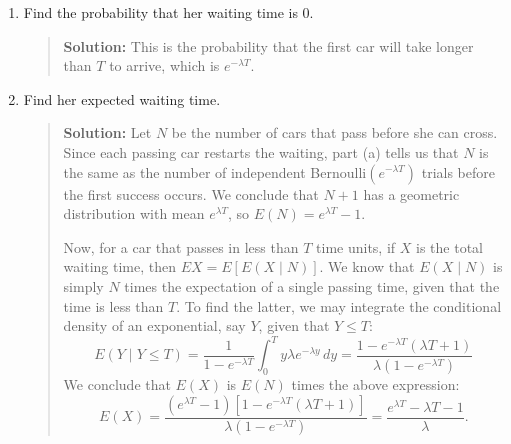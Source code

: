 \documentclass{article}
\begin{document}
\begin{enumerate}
  \begin{enumerate}

  \item Find the probability that her waiting time is 0.
  \begin{quotation}{\bf Solution:}
  This is the probability that the first car will take longer than $T$ to arrive, which
  is $e^{-\lambda T}$.
  \end{quotation}
  

  \item Find her expected waiting time.
  \begin{quotation}{\bf Solution:}
  Let $N$ be the number of cars that pass before she can cross.  Since each passing car 
  restarts the waiting, part (a) tells us that $N$ is the same as the number
  of independent Bernoulli$(e^{-\lambda T})$ trials before the first success occurs.  
  We conclude that $N+1$ has a geometric distribution with mean $e^{\lambda T}$,
  so $E(N)=e^{\lambda T}-1$.

  Now, for a car that passes in less than $T$ time units,
  if $X$ is the total waiting time, then $E X = E[E(X\mid N)]$.  We know
  that $E(X \mid N)$ is simply $N$ times the expectation of a single passing
  time, given that the time is less than $T$.  To find the latter, we may integrate the
  conditional density of an exponential, say $Y$, given that $Y\le T$:
  \[
  E(Y \mid Y \le T) = \frac{1}{1-e^{-\lambda T}} \int_0 ^T y \lambda e^{-\lambda y} \,dy
  = \frac{1-e^{-\lambda T}(\lambda T+1)}{\lambda(1-e^{-\lambda T})}
  \]
  We conclude that $E(X)$ is $E(N)$ times the above expression:
  \[
  E(X) = \frac{(e^{\lambda T}-1)[1-e^{-\lambda T}(\lambda T+1)]}
  {\lambda(1-e^{-\lambda T})} =
  \frac{e^{\lambda T} - \lambda T - 1}{\lambda}.
  \]
  \end{quotation}
  

  \end{enumerate}

\end{enumerate}
\end{document}

